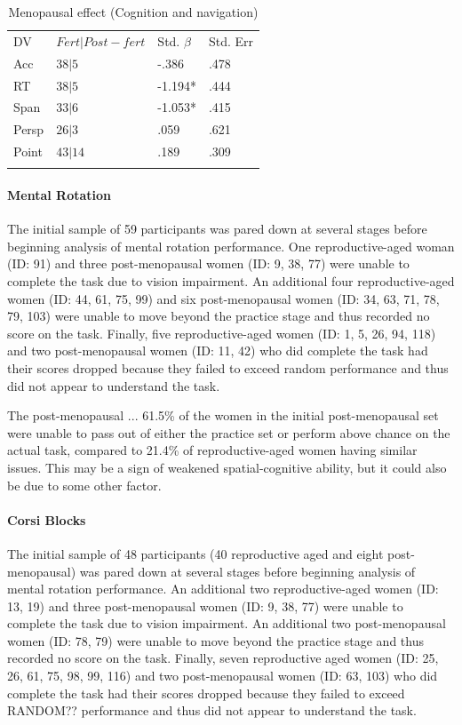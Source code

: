 \begin{table}
\caption{Menopausal effect (Cognition and navigation)}
\label{tab:fert_cog}  
\begin{tabular}{llll}
\hline\noalign{\smallskip}
DV & $Fert|Post-fert$ & Std. $\beta$ & Std. Err  \\
\noalign{\smallskip}\hline\noalign{\smallskip}
Acc & $38|5$ & -.386 & .478 \\
RT & $38|5$ & -1.194* & .444\\
Span & $33|6$ & -1.053* & .415 \\
Persp & $26|3$ & .059 & .621 \\
Point & $43|14$ & .189 & .309 \\
\noalign{\smallskip}\hline
\end{tabular}
\end{table}

\paragraph{Mental Rotation}
The initial sample of 59 participants was pared down at several stages before beginning analysis of mental rotation performance.  One reproductive-aged woman (ID: 91) and three post-menopausal women (ID: 9, 38, 77) were unable to complete the task due to vision impairment.  An additional four reproductive-aged women (ID: 44, 61, 75, 99) and six post-menopausal women (ID: 34, 63, 71, 78, 79, 103) were unable to move beyond the practice stage and thus recorded no score on the task.  Finally, five reproductive-aged women (ID: 1, 5, 26, 94, 118) and two post-menopausal women (ID: 11, 42) who did complete the task had their scores dropped because they failed to exceed random performance and thus did not appear to understand the task.

The post-menopausal ...  61.5\% of the women in the initial post-menopausal set were unable to pass out of either the practice set or perform above chance on the actual task, compared to 21.4\% of reproductive-aged women having similar issues.  This may be a sign of weakened spatial-cognitive ability, but it could also be due to some other factor.

\paragraph{Corsi Blocks}
The initial sample of 48 participants (40 reproductive aged and eight post-menopausal) was pared down at several stages before beginning analysis of mental rotation performance.  An additional two reproductive-aged women (ID: 13, 19) and three post-menopausal women (ID: 9, 38, 77) were unable to complete the task due to vision impairment.  An additional two post-menopausal women (ID: 78, 79) were unable to move beyond the practice stage and thus recorded no score on the task.  Finally, seven reproductive aged women (ID: 25, 26, 61, 75, 98, 99, 116) and two post-menopausal women (ID: 63, 103) who did complete the task had their scores dropped because they failed to exceed RANDOM?? performance and thus did not appear to understand the task.

